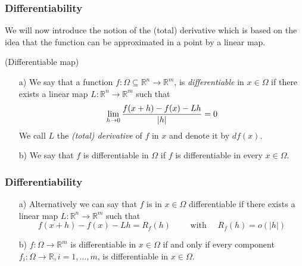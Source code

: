  \begin{frame}[fragile] \frametitle{Differentiability}


We will now introduce the notion of  the (total) derivative which is based on the idea
that the function can be approximated in a point by a linear map.


\begin{definition}(Differentiable map)

\begin{itemize}
\item[a)]
We say that a function
   $f\colon \Omega \subseteq \mathbb R^n \rightarrow \mathbb{R}^m$, 
   is \emph{differentiable} in 
   $x \in \Omega$ if there exists a linear map
  $L\colon \mathbb{R}^n \rightarrow \mathbb{R}^m$ such that
  \[ \lim_{h \rightarrow 0} {f(x+h) - f(x) - Lh \over |h|} = 0 \]
  We call $L$ the {\it (total) derivative }
  of $f$ in $x$ and denote it by $df(x)$.

\item[b)]
  We say that $f$ is differentiable in $\Omega$ if $f$ is differentiable in every
  $x \in \Omega$.
  \end{itemize}
\end{definition}

\end{frame}


 \begin{frame}[fragile] \frametitle{Differentiability}

  \begin{itemize}
  \item[a)] 
  Alternatively we can say that
    $f$ is in $x \in \Omega$ differentiable if there exists a linear map
     $L\colon \mathbb{R}^n \rightarrow \mathbb{R}^m$ 
     such that
    \[f(x+h) - f(x) - Lh
    = R_f(h) 
    \qquad \text{ with }  \quad
    R_f(h) = o(|h|)\]
  \item[b)] $f\colon \Omega \rightarrow \mathbb{R}^m$ is 
     differentiable in  $x \in \Omega$ 
     if and only if
     every component
    $f_i\colon \Omega \rightarrow \mathbb{R}, i=1, \ldots, m$,
    is differentiable in  $x \in \Omega$.
  \end{itemize}


\end{frame}



